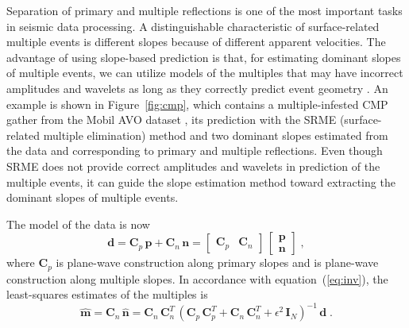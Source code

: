 Separation of primary and multiple reflections is one of the most
important tasks in seismic data processing. A distinguishable
characteristic of surface-related multiple events is different slopes
because of different apparent velocities. The advantage of using
slope-based prediction is that, for estimating dominant slopes of
multiple events, we can utilize models of the multiples that may have
incorrect amplitudes and wavelets as long as they correctly predict
event geometry \cite[]{antoine}. An example is shown in
Figure~\ref{fig:cmp}, which contains a multiple-infested CMP gather
from the Mobil AVO dataset \cite[]{CSI00-00-00010213}, its prediction
with the SRME (surface-related multiple elimination) method
\cite[]{GEO57-09-11661177} and two dominant slopes estimated from the
data and corresponding to primary and multiple reflections. Even
though SRME does not provide correct amplitudes and wavelets in
prediction of the multiple events, it can guide the slope estimation
method toward extracting the dominant slopes of multiple events.



The model of the data is now \cite[]{GEO65-02-05740583,FBR20-03-01610167}
\begin{equation}
\label{eq:splusn}
  \mathbf{d} = \mathbf{C}_p\,\mathbf{p}+\mathbf{C}_n\,\mathbf{n} = 
  \left[\begin{array}{cc} \mathbf{C}_p & \mathbf{C}_n \end{array}\right]\,
  \left[\begin{array}{c} \mathbf{p} \\ \mathbf{n} \end{array}\right]\;,
\end{equation}
where $\mathbf{C}_p$ is plane-wave construction along primary slopes
and   is plane-wave
construction along multiple slopes. In accordance with
equation~(\ref{eq:inv}), the least-squares estimates of the multiples
is
\begin{equation}
\label{eq:mult}
  \widehat{\mathbf{m}} = \mathbf{C}_n\,\widehat{\mathbf{n}} =
  \mathbf{C}_n\,\mathbf{C}_n^T\,
  \left(\mathbf{C}_p\,\mathbf{C}_p^T + \mathbf{C}_n\,\mathbf{C}_n^T + \epsilon^2\,\mathbf{I}_N\right)^{-1}\,\mathbf{d}\;.
\end{equation}

